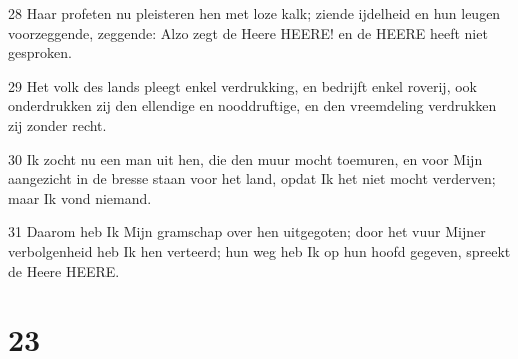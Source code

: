 \par 28 Haar profeten nu pleisteren hen met loze kalk; ziende ijdelheid en hun leugen voorzeggende, zeggende: Alzo zegt de Heere HEERE! en de HEERE heeft niet gesproken.
\par 29 Het volk des lands pleegt enkel verdrukking, en bedrijft enkel roverij, ook onderdrukken zij den ellendige en nooddruftige, en den vreemdeling verdrukken zij zonder recht.
\par 30 Ik zocht nu een man uit hen, die den muur mocht toemuren, en voor Mijn aangezicht in de bresse staan voor het land, opdat Ik het niet mocht verderven; maar Ik vond niemand.
\par 31 Daarom heb Ik Mijn gramschap over hen uitgegoten; door het vuur Mijner verbolgenheid heb Ik hen verteerd; hun weg heb Ik op hun hoofd gegeven, spreekt de Heere HEERE.

\chapter{23}

